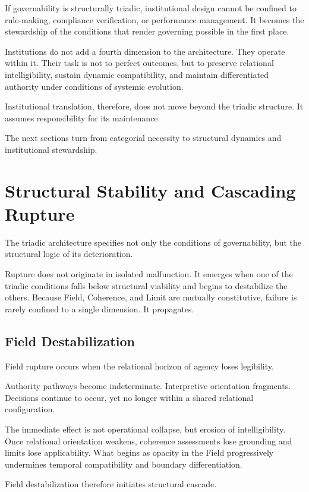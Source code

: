 \documentclass[12pt]{article}
\begin{document}
If governability is structurally triadic, institutional design cannot be confined to rule-making, compliance verification, or performance management. It becomes the stewardship of the conditions that render governing possible in the first place.

Institutions do not add a fourth dimension to the architecture. They operate within it. Their task is not to perfect outcomes, but to preserve relational intelligibility, sustain dynamic compatibility, and maintain differentiated authority under conditions of systemic evolution.

Institutional translation, therefore, does not move beyond the triadic structure. It assumes responsibility for its maintenance.

The next sections turn from categorial necessity to structural dynamics and institutional stewardship.

\section{Structural Stability and Cascading Rupture}


The triadic architecture specifies not only the conditions of governability, but the structural logic of its deterioration.

Rupture does not originate in isolated malfunction. It emerges when one of the triadic conditions falls below structural viability and begins to destabilize the others. Because Field, Coherence, and Limit are mutually constitutive, failure is rarely confined to a single dimension. It propagates.

\subsection{Field Destabilization}


Field rupture occurs when the relational horizon of agency loses legibility.

Authority pathways become indeterminate. Interpretive orientation fragments. Decisions continue to occur, yet no longer within a shared relational configuration.

The immediate effect is not operational collapse, but erosion of intelligibility. Once relational orientation weakens, coherence assessments lose grounding and limits lose applicability. What begins as opacity in the Field progressively undermines temporal compatibility and boundary differentiation.

Field destabilization therefore initiates structural cascade.
\end{document}
